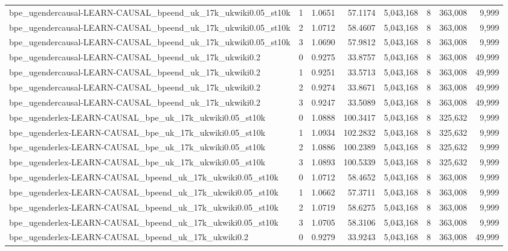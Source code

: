 \begin{tabular}{lrrrrrrr}
bpe\_ugendercausal-LEARN-CAUSAL\_bpeend\_uk\_17k\_ukwiki0.05\_st10k & 1 & 1.0651 & 57.1174 & 5,043,168 & 8 & 363,008 & 9,999 \\
bpe\_ugendercausal-LEARN-CAUSAL\_bpeend\_uk\_17k\_ukwiki0.05\_st10k & 2 & 1.0712 & 58.4607 & 5,043,168 & 8 & 363,008 & 9,999 \\
bpe\_ugendercausal-LEARN-CAUSAL\_bpeend\_uk\_17k\_ukwiki0.05\_st10k & 3 & 1.0690 & 57.9812 & 5,043,168 & 8 & 363,008 & 9,999 \\
bpe\_ugendercausal-LEARN-CAUSAL\_bpeend\_uk\_17k\_ukwiki0.2 & 0 & 0.9275 & 33.8757 & 5,043,168 & 8 & 363,008 & 49,999 \\
bpe\_ugendercausal-LEARN-CAUSAL\_bpeend\_uk\_17k\_ukwiki0.2 & 1 & 0.9251 & 33.5713 & 5,043,168 & 8 & 363,008 & 49,999 \\
bpe\_ugendercausal-LEARN-CAUSAL\_bpeend\_uk\_17k\_ukwiki0.2 & 2 & 0.9274 & 33.8671 & 5,043,168 & 8 & 363,008 & 49,999 \\
bpe\_ugendercausal-LEARN-CAUSAL\_bpeend\_uk\_17k\_ukwiki0.2 & 3 & 0.9247 & 33.5089 & 5,043,168 & 8 & 363,008 & 49,999 \\
bpe\_ugenderlex-LEARN-CAUSAL\_bpe\_uk\_17k\_ukwiki0.05\_st10k & 0 & 1.0888 & 100.3417 & 5,043,168 & 8 & 325,632 & 9,999 \\
bpe\_ugenderlex-LEARN-CAUSAL\_bpe\_uk\_17k\_ukwiki0.05\_st10k & 1 & 1.0934 & 102.2832 & 5,043,168 & 8 & 325,632 & 9,999 \\
bpe\_ugenderlex-LEARN-CAUSAL\_bpe\_uk\_17k\_ukwiki0.05\_st10k & 2 & 1.0886 & 100.2389 & 5,043,168 & 8 & 325,632 & 9,999 \\
bpe\_ugenderlex-LEARN-CAUSAL\_bpe\_uk\_17k\_ukwiki0.05\_st10k & 3 & 1.0893 & 100.5339 & 5,043,168 & 8 & 325,632 & 9,999 \\
bpe\_ugenderlex-LEARN-CAUSAL\_bpeend\_uk\_17k\_ukwiki0.05\_st10k & 0 & 1.0712 & 58.4652 & 5,043,168 & 8 & 363,008 & 9,999 \\
bpe\_ugenderlex-LEARN-CAUSAL\_bpeend\_uk\_17k\_ukwiki0.05\_st10k & 1 & 1.0662 & 57.3711 & 5,043,168 & 8 & 363,008 & 9,999 \\
bpe\_ugenderlex-LEARN-CAUSAL\_bpeend\_uk\_17k\_ukwiki0.05\_st10k & 2 & 1.0719 & 58.6275 & 5,043,168 & 8 & 363,008 & 9,999 \\
bpe\_ugenderlex-LEARN-CAUSAL\_bpeend\_uk\_17k\_ukwiki0.05\_st10k & 3 & 1.0705 & 58.3106 & 5,043,168 & 8 & 363,008 & 9,999 \\
bpe\_ugenderlex-LEARN-CAUSAL\_bpeend\_uk\_17k\_ukwiki0.2 & 0 & 0.9279 & 33.9243 & 5,043,168 & 8 & 363,008 & 49,999 \\

\end{tabular}
